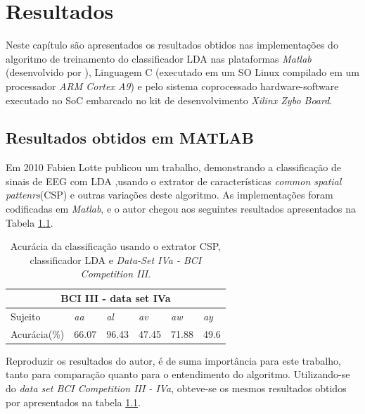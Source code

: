 \chapter[Resultados e Dicussão ]{Resultados}

Neste capítulo são apresentados os resultados obtidos nas implementações do algoritmo de treinamento do classificador LDA nas plataformas \textit{Matlab} (desenvolvido por \cite{F.Lotte}), Linguagem C (executado em um SO Linux compilado em um processador \textit{ARM Cortex A9}) e pelo sistema coprocessado hardware-software executado no SoC embarcado no kit de desenvolvimento \textit{Xilinx Zybo Board}.

\section{Resultados obtidos em MATLAB}
Em 2010 Fabien Lotte publicou um trabalho, demonstrando a classificação de sinais de EEG com LDA \cite{F.Lotte},usando o extrator de características \textit{common spatial pattenrs}(CSP) e outras
variações deste algoritmo. 
As implementações foram codificadas em \textit{Matlab}, e o autor chegou aos seguintes resultados apresentados na Tabela \ref{resultlotte}.

\begin{table}[h]
\centering
\caption{Acurácia da classificação usando o extrator CSP, classificador LDA e  \textit{Data-Set IVa - BCI Competition III}.}
\label{resultlotte}
\begin{tabular}{|l|l|l|l|l|l|}
\hline
\multicolumn{6}{|c|}{BCI III -  data set IVa}  \\ \hline
Sujeito & \textit{aa}    & \textit{al}    & \textit{av}    & \textit{aw}    & \textit{ay}   \\ \hline
Acurácia(\%)     & 66.07 & 96.43 & 47.45 & 71.88 & 49.6 \\ \hline
\end{tabular}
\end{table}
 
Reproduzir os resultados do autor, é de suma importância para este trabalho, tanto para comparação quanto para o entendimento do algoritmo. Utilizando-se do \textit{data set BCI Competition III - IVa}, obteve-se os mesmos resultados obtidos por \cite{F.Lotte} apresentados na tabela \ref{resultlotte}.

